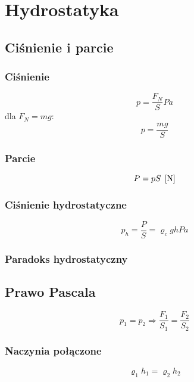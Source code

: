 \chapter{Hydrostatyka}

\section{Ciśnienie i parcie}

\subsection{Ciśnienie}
\begin{equation}
  p = \frac{F_N}{S} \unit{Pa}
\end{equation}
dla $F_N = m g$:
\begin{equation}
  p = \frac{m g}{S}
\end{equation}

\subsection{Parcie}
\begin{equation*}
  P = pS \;\left[\mathrm{N}\right]
\end{equation*}

\subsection{Ciśnienie hydrostatyczne}
\begin{equation*}
  p_h = \frac P S = \varrho_c gh \unit{Pa}
\end{equation*}

\subsection{Paradoks hydrostatyczny}

\section{Prawo Pascala}
\begin{equation}
  p_1 = p_2 \Rightarrow \frac{F_1}{S_1} = \frac{F_2}{S_2}
\end{equation}

\subsection{Naczynia połączone}
\begin{equation*}
  \varrho_1 h_1 = \varrho_2 h_2
\end{equation*}

